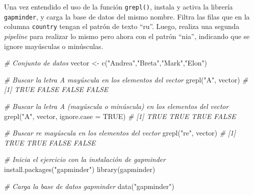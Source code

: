 \documentclass[
]{article}
\newenvironment{Shaded}{\begin{snugshade}}{\end{snugshade}}
\newcommand{\AttributeTok}[1]{\textcolor[rgb]{0.77,0.63,0.00}{#1}}
\newcommand{\CommentTok}[1]{\textcolor[rgb]{0.56,0.35,0.01}{\textit{#1}}}
\newcommand{\ConstantTok}[1]{\textcolor[rgb]{0.00,0.00,0.00}{#1}}
\newcommand{\FunctionTok}[1]{\textcolor[rgb]{0.00,0.00,0.00}{#1}}
\newcommand{\NormalTok}[1]{#1}
\newcommand{\OtherTok}[1]{\textcolor[rgb]{0.56,0.35,0.01}{#1}}
\newcommand{\StringTok}[1]{\textcolor[rgb]{0.31,0.60,0.02}{#1}}
\theoremstyle{definition}
\theoremstyle{definition}
\theoremstyle{definition}
\theoremstyle{definition}
\theoremstyle{remark}
\begin{document}
Una vez entendido el uso de la función \texttt{grepl()}, instala y activa la librería \texttt{gapminder}, y carga la base de datos del mismo nombre. Filtra las filas que en la columna \texttt{country} tengan el patrón de texto ``ru''. Luego, realiza una segunda \emph{pipeline} para realizar lo mismo pero ahora con el patrón ``nia'', indicando que se ignore mayúsculas o minúsculas.

\begin{Shaded}
\begin{Highlighting}[]
\CommentTok{\# Conjunto de datos}
\NormalTok{vector }\OtherTok{\textless{}{-}} \FunctionTok{c}\NormalTok{(}\StringTok{"Andrea"}\NormalTok{,}\StringTok{"Breta"}\NormalTok{,}\StringTok{"Mark"}\NormalTok{,}\StringTok{"Elon"}\NormalTok{)}

\CommentTok{\# Buscar la letra A mayúscula en los elementos del vector}
\FunctionTok{grepl}\NormalTok{(}\StringTok{"A"}\NormalTok{, vector)}
\CommentTok{\# [1]  TRUE FALSE FALSE FALSE}

\CommentTok{\# Buscar la letra A (mayúscula o minúscula) en los elementos del vector}
\FunctionTok{grepl}\NormalTok{(}\StringTok{"A"}\NormalTok{, vector, }\AttributeTok{ignore.case =} \ConstantTok{TRUE}\NormalTok{)}
\CommentTok{\# [1]  TRUE  TRUE  TRUE FALSE}

\CommentTok{\# Buscar re mayúscula en los elementos del vector}
\FunctionTok{grepl}\NormalTok{(}\StringTok{"re"}\NormalTok{, vector)}
\CommentTok{\# [1]  TRUE  TRUE FALSE FALSE}
\end{Highlighting}
\end{Shaded}

\begin{Shaded}
\begin{Highlighting}[]
\CommentTok{\# Inicia el ejercicio con la instalación de gapminder}
\FunctionTok{install.packages}\NormalTok{(}\StringTok{"gapminder"}\NormalTok{)}
\FunctionTok{library}\NormalTok{(gapminder)}

\CommentTok{\# Carga la base de datos gapminder}
\FunctionTok{data}\NormalTok{(}\StringTok{"gapminder"}\NormalTok{)}
\end{Highlighting}
\end{Shaded}
\end{document}
